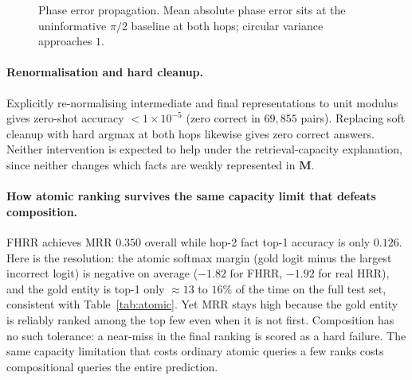 \documentclass[11pt]{article}
\theoremstyle{definition}
\newcommand{\mem}{\mathbf{M}}
\begin{document}
\begin{figure}[H]
\centering
{}
\caption{Phase error propagation. Mean absolute phase error sits at the
uninformative $\pi/2$ baseline at both hops; circular variance approaches $1$.}
\label{fig:phaseerr}
\end{figure}

\paragraph{Renormalisation and hard cleanup.}
Explicitly re-normalising intermediate and final representations to unit modulus
gives zero-shot accuracy $< 1 \times 10^{-5}$ (zero correct in $69{,}855$
pairs). Replacing soft cleanup with hard argmax at both hops likewise gives
zero correct answers. Neither intervention is expected to help under the
retrieval-capacity explanation, since neither changes which facts are weakly
represented in $\mem$.

\paragraph{How atomic ranking survives the same capacity limit that defeats composition.}
FHRR achieves MRR $0.350$ overall while hop-2 fact top-1 accuracy is only
$0.126$. Here is the resolution: the atomic softmax margin (gold logit minus
the largest incorrect logit) is negative on average ($-1.82$ for FHRR, $-1.92$
for real HRR), and the gold entity is top-1 only $\approx 13$ to $16\%$ of the
time on the full test set, consistent with Table~\ref{tab:atomic}. Yet MRR
stays high because the gold entity is reliably ranked among the top few even
when it is not first. Composition has no such tolerance: a near-miss in the
final ranking is scored as a hard failure. The same capacity limitation that
costs ordinary atomic queries a few ranks costs compositional queries the
entire prediction.
\end{document}
